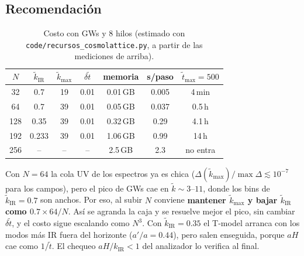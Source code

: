 \documentclass[11pt]{article}
\begin{document}
        \subsection{Recomendación}
            \label{sec:recomendacion}

            \begin{table}[H]
                \centering
                \begin{tabular}{ccccccc}
                    \toprule
                    $N$ & $\tilde k_{\text{IR}}$ & $\tilde k_{\max}$ & $\delta\tilde t$ & memoria & s/paso & $\tilde t_{\max} = 500$ \\
                    \midrule
                    32  & 0.7   & 19  & 0.01 & 0.01\,GB & 0.005 & 4\,min \\
                    64  & 0.7   & 39  & 0.01 & 0.05\,GB & 0.037 & 0.5\,h \\
                    128 & 0.35  & 39  & 0.01 & 0.32\,GB & 0.29  & 4.1\,h \\
                    192 & 0.233 & 39  & 0.01 & 1.06\,GB & 0.99  & 14\,h \\
                    256 & --    & --  & --   & 2.5\,GB  & 2.3   & no entra \\
                    \bottomrule
                \end{tabular}
                \caption{Costo con GWs y 8 hilos (estimado con \texttt{code/recursos\_cosmolattice.py}, a partir de las mediciones de arriba).}
                \label{tab:recursos}
            \end{table}

            Con $N = 64$ la cola UV de los espectros ya es chica ($\Delta(\tilde k_{\max})/\max\Delta \lesssim 10^{-7}$ para los campos), pero el pico de GWs cae en $\tilde k \sim 3$--$11$, donde los bins de $\tilde k_{\text{IR}} = 0.7$ son anchos. Por eso, al subir $N$ conviene \textbf{mantener $\tilde k_{\max}$ y bajar $\tilde k_{\text{IR}}$ como $0.7 \times 64/N$}. Así se agranda la caja y se resuelve mejor el pico, sin cambiar $\delta\tilde t$, y el costo sigue escalando como $N^3$. Con $\tilde k_{\text{IR}} = 0.35$ el T-model arranca con los modos más IR fuera del horizonte ($a'/a = 0.44$), pero salen enseguida, porque $aH$ cae como $1/\tilde t$. El chequeo $aH/k_{\text{IR}} < 1$ del analizador lo verifica al final.
\end{document}
